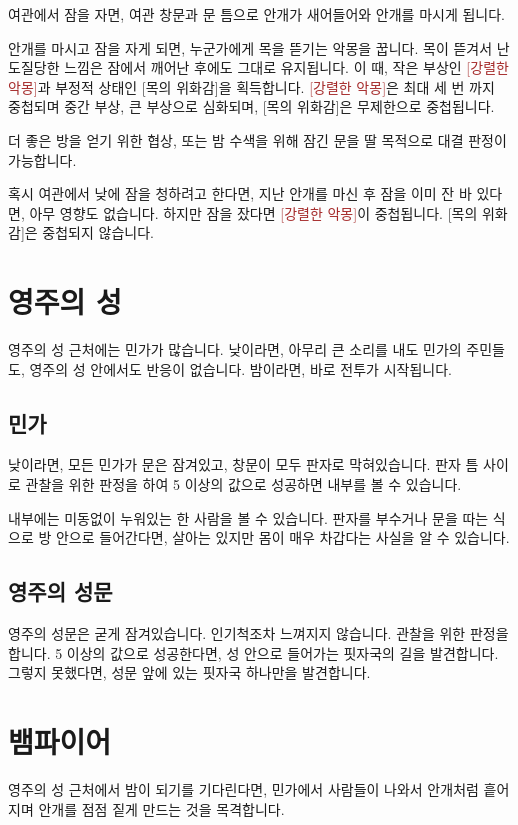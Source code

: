 \documentclass{report}
\begin{document}
	여관에서 잠을 자면, 여관 창문과 문 틈으로 안개가 새어들어와 안개를 마시게 됩니다.
	
	안개를 마시고 잠을 자게 되면, 누군가에게 목을 뜯기는 악몽을 꿉니다. 목이 뜯겨서 난도질당한 느낌은 잠에서 깨어난 후에도 그대로 유지됩니다. 이 때, 작은 부상인 \textcolor{Brown}{[강렬한 악몽]}과 부정적 상태인 \textcolor{RubineRed}{[목의 위화감]}을 획득합니다. \textcolor{Brown}{[강렬한 악몽]}은 최대 세 번 까지 중첩되며 중간 부상, 큰 부상으로 심화되며, \textcolor{RubineRed}{[목의 위화감]}은 무제한으로 중첩됩니다.
	
	더 좋은 방을 얻기 위한 협상, 또는 밤 수색을 위해 잠긴 문을 딸 목적으로 대결 판정이 가능합니다.
	
	혹시 여관에서 낮에 잠을 청하려고 한다면, 지난 안개를 마신 후 잠을 이미 잔 바 있다면, 아무 영향도 없습니다. 하지만 잠을 잤다면 \textcolor{Brown}{[강렬한 악몽]}이 중첩됩니다. \textcolor{RubineRed}{[목의 위화감]}은 중첩되지 않습니다.
	
	\section{영주의 성}
	영주의 성 근처에는 민가가 많습니다. 낮이라면, 아무리 큰 소리를 내도 민가의 주민들도, 영주의 성 안에서도 반응이 없습니다. 밤이라면, 바로 전투가 시작됩니다.
	
	\subsection{민가}
	낮이라면, 모든 민가가 문은 잠겨있고, 창문이 모두 판자로 막혀있습니다. 판자 틈 사이로 관찰을 위한 판정을 하여 5 이상의 값으로 성공하면 내부를 볼 수 있습니다.
	
	내부에는 미동없이 누워있는 한 사람을 볼 수 있습니다. 판자를 부수거나 문을 따는 식으로 방 안으로 들어간다면, 살아는 있지만 몸이 매우 차갑다는 사실을 알 수 있습니다.
	
	\subsection{영주의 성문}
	영주의 성문은 굳게 잠겨있습니다. 인기척조차 느껴지지 않습니다. 관찰을 위한 판정을 합니다. 5 이상의 값으로 성공한다면, 성 안으로 들어가는 핏자국의 길을 발견합니다. 그렇지 못했다면, 성문 앞에 있는 핏자국 하나만을 발견합니다.
	
	\section{뱀파이어}
	영주의 성 근처에서 밤이 되기를 기다린다면, 민가에서 사람들이 나와서 안개처럼 흩어지며 안개를 점점 짙게 만드는 것을 목격합니다.
	
\end{document}
